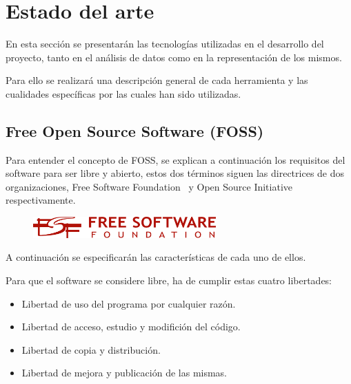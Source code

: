 \documentclass[a4paper, spanish, 12pt]{book}
\begin{document}

\cleardoublepage
\chapter{Estado del arte}

En esta secci\'on se presentar\'an las tecnolog\'ias utilizadas en el desarrollo
del proyecto, tanto en el an\'alisis de datos como en la representaci\'on de los
mismos.

Para ello se realizar\'a una descripci\'on general de cada herramienta y las
cualidades espec\'ificas por las cuales han sido utilizadas.

%

\section{Free Open Source Software (FOSS)}
\label{sec:FOSS}

Para entender el concepto de FOSS, se explican a continuaci\'on los requisitos
del software para ser libre y abierto, estos dos t\'erminos siguen las directrices
de dos organizaciones, Free Software Foundation~\cite{fsf} y
Open Source Initiative~\cite{opensource} respectivamente.

\begin{figure}[H]
  \centering
  \includegraphics[width=7cm, keepaspectratio]{img/fsf}
\end{figure}

A continuaci\'on se especificar\'an las caracter\'isticas de cada uno de ellos.

Para que el software se considere libre, ha de cumplir estas cuatro libertades:

\begin{itemize}

\item Libertad de uso del programa por cualquier raz\'on.

\item Libertad de acceso, estudio y modifici\'on del c\'odigo.

\item Libertad de copia y distribuci\'on.

\item Libertad de mejora y publicaci\'on de las mismas.

\end{itemize}
\end{document}
